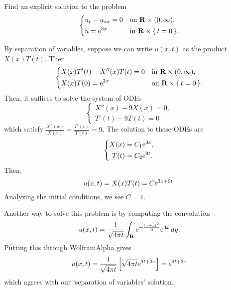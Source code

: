 \begin{problem}
  Find an explicit solution to the problem
  \[
    \left\{
      \begin{aligned}
        &u_t-u_{xx}=0&&\text{on \(\mathbf{R}\times(0,\infty)\),}\\
        &u=\mathrm{e}^{3x}&&\text{in \(\mathbf{R}\times\{\,t=0\,\}\).}
      \end{aligned}
    \right.
  \]
\end{problem}
\begin{solution*}
  By separation of variables, suppose we can write \(u(x,t)\) as the
  product \(X(x)T(t)\). Then
  \[
    \left\{
      \begin{aligned}
        &X(x)T'(t)-X''(x)T(t)=0&&\text{in \(\mathbf{R}\times(0,\infty)\),}\\
        &X(x)T(0)=\mathrm{e}^{3x}&&\text{on \(\mathbf{R}\times\{\,t=0\,\}\).}
      \end{aligned}
    \right.
  \]
  Then, it suffices to solve the system of ODEs
  \[
    \left\{
      \begin{aligned}
        X''(x)-9X(x)=0,\\
        T'(t)-9T(t)=0
      \end{aligned}
    \right.
  \]
  which satisfy \(\frac{X''(x)}{X(x)}=\frac{T'(t)}{T(t)}=9\). The solution
  to these ODEs are
  \[
    \left\{%
      \begin{aligned}
        X(x)&=C_1\rme^{3x},\\
        T(t)&=C_2\rme^{9t}.
      \end{aligned}
    \right.
  \]
  Then,
  \[
    u(x,t)=X(x)T(t)=C\mathrm{e}^{3x+9t}.
  \]
  Analyzing the initial conditions, we see \(C=1\).

  Another way to solve this problem is by computing the convolution
  \[
    u(x,t)=%
    \frac{1}{\sqrt{4\pi t}}
    \int_\R \rme^{-\frac{|x-y|^2}{4t}}
    \rme^{3x}\diff y.
  \]
  Putting this through \textsf{WolframAlpha} gives
  \[
    u(x,t)=%
    \frac{1}{\sqrt{4\pi t}}%
    \left[%
      \sqrt{4\pi t}\rme^{9t+3x}%
    \right]=%
    \rme^{9t+3x}
  \]
  which agrees with our `separation of variables' solution.
\end{solution*}

